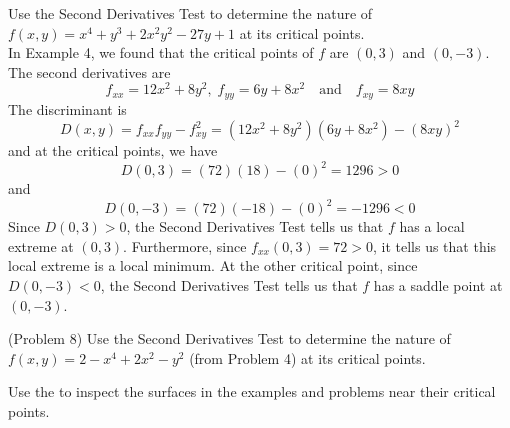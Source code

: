 \documentclass[handout]{ximera}
\begin{document}
\begin{example}[Example 8]
Use the Second Derivatives Test to determine the nature of  $f(x,y) = x^4 + y^3 + 2x^2y^2 -27y + 1$ at its critical points.\\
In Example 4, we found that the critical points of $f$ are $(0, 3)$ and $(0, -3)$.
The second derivatives are
\[
f_{xx} = 12x^2 + 8y^2,\; f_{yy} = 6y + 8x^2 \quad \text{and} \quad f_{xy} = 8xy
\]
The discriminant is
\[
D(x,y) = f_{xx} f_{yy} - f_{xy}^2 = (12x^2 + 8y^2)(6y + 8x^2) - (8xy)^2
\]
and at the critical points, we have
\[
D(0, 3)  = (72)(18) - (0)^2 = 1296 > 0
\]
and
\[
D(0, -3)  = (72)(-18) - (0)^2 = -1296 < 0
\]
Since $D(0, 3) > 0$, the Second Derivatives Test tells us that $f$ has a local extreme at $(0, 3)$. Furthermore, since
$f_{xx} (0,3) = 72 > 0$, it tells us that this local extreme is a local minimum. At the other critical point,
since $D(0, -3) < 0$, the Second Derivatives Test tells us that $f$ has a saddle point at $(0, -3)$.
\end{example}

\begin{problem}(Problem 8)
Use the Second Derivatives Test to determine the nature of  $f(x,y) = 2-x^4 + 2x^2 - y^2$ 
(from Problem 4) at its critical points.\\
\end{problem}

Use the  to inspect
the surfaces in the examples and problems near their critical points.
\end{document}
